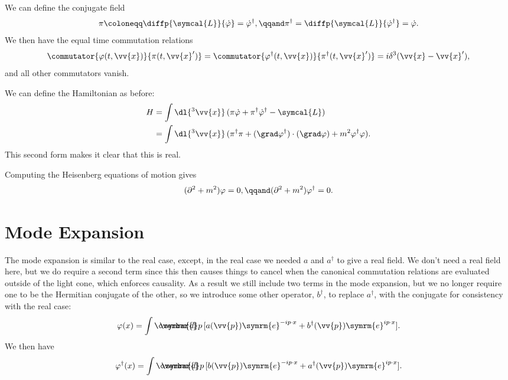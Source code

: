 \documentclass[fleqn]{NotesClass}
\newcommand{\dalembertian}{\partial^2}
\newcommand{\e}{\symrm{e}}
\newcommand{\lagrangianDensity}{\symcal{L}}
\newcommand{\hermit}{{\dagger}}
\newcommand{\dbar}[1][0.0]{\ThisStyle{\ensurestackMath{%
            \stackengine{#1\LMex}{\SavedStyle \symrm{d}}{\SavedStyle\overbar{}%
                \mkern2.25mu}{O}{r}{F}{F}{L}}}}
\newcommand{\invariantmeasure}[1]{%
    \mathchoice{\dbar #1}{\dbar #1}{\dbar[.05] #1}{\dbar[.06] #1}
}
\begin{document}
    We can define the conjugate field
    \begin{equation}
        \pi \coloneqq \diffp{\lagrangianDensity}{\dot{\varphi}} = \dot{\varphi}^\hermit, \qqand \pi^\hermit = \diffp{\lagrangianDensity}{\dot{\varphi}^\hermit} = \dot{\varphi}.
    \end{equation}
    We then have the equal time commutation relations
    \begin{equation}
        \commutator{\varphi(t, \vv{x})}{\pi(t, \vv{x}')} = \commutator{\varphi^\hermit(t, \vv{x})}{\pi^\hermit(t, \vv{x}')} = i\delta^3(\vv{x} - \vv{x}'),
    \end{equation}
    and all other commutators vanish.
    
    We can define the Hamiltonian as before:
    \begin{align}
        H &= \int \dl{^3\vv{x}} \, (\pi\dot{\varphi} + \pi^\hermit \dot{\varphi}^\hermit - \lagrangianDensity)\\
        &= \int \dl{^3\vv{x}} \, (\pi^\hermit \pi + (\grad \varphi^\hermit) \cdot (\grad \varphi) + m^2 \varphi^\hermit \varphi).
    \end{align}
    This second form makes it clear that this is real.
    
    Computing the Heisenberg equations of motion gives
    \begin{equation}
        (\dalembertian + m^2)\varphi = 0, \qqand (\dalembertian + m^2)\varphi^\hermit = 0.
    \end{equation}
    
    \section{Mode Expansion}\label{sec:mode expansion complex scalar field}
    The mode expansion is similar to the real case, except, in the real case we needed \(a\) and \(a^\hermit\) to give a real field.
    We don't need a real field here, but we do require a second term since this then causes things to cancel when the canonical commutation relations are evaluated outside of the light cone, which enforces causality.
    As a result we still include two terms in the mode expansion, but we no longer require one to be the Hermitian conjugate of the other, so we introduce some other operator, \(b^\hermit\), to replace \(a^\hermit\), with the conjugate for consistency with the real case:
    \begin{equation}
        \varphi(x) = \int \invariantmeasure{p} \, [a(\vv{p}) \e^{-ip\cdot x} + b^\hermit(\vv{p}) \e^{ip \cdot x}].
    \end{equation}
    We then have
    \begin{equation}
        \varphi^\hermit(x) = \int \invariantmeasure{p} \, [b(\vv{p}) \e^{-ip\cdot x} + a^\hermit(\vv{p})\e^{ip\cdot x}].
    \end{equation}
    
\end{document}
